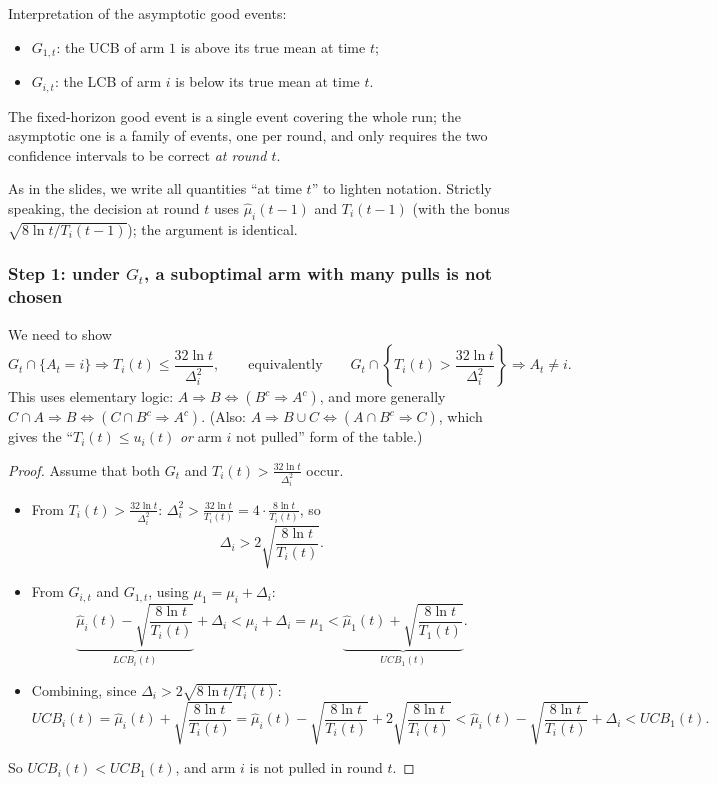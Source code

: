 Interpretation of the asymptotic good events:
\begin{itemize}
    \item $G_{1,t}$: the UCB of arm $1$ is above its true mean at time $t$;
    \item $G_{i,t}$: the LCB of arm $i$ is below its true mean at time $t$.
\end{itemize}
The fixed-horizon good event is a single event covering the whole run; the asymptotic one is a family of events, one per round, and only requires the two confidence intervals to be correct \emph{at round $t$}.

\begin{remark}[Indices]
As in the slides, we write all quantities ``at time $t$'' to lighten notation. Strictly speaking, the decision at round $t$ uses $\hat{\mu}_i(t-1)$ and $T_i(t-1)$ (with the bonus $\sqrt{8\ln t/T_i(t-1)}$); the argument is identical.
\end{remark}

\subsubsection*{Step 1: under $G_t$, a suboptimal arm with many pulls is not chosen}

We need to show
\[
G_t \cap \{A_t = i\} \Rightarrow T_i(t) \leq \frac{32\ln t}{\Delta_i^2},
\qquad\text{equivalently}\qquad
G_t \cap \left\{T_i(t) > \frac{32\ln t}{\Delta_i^2}\right\} \Rightarrow A_t \neq i.
\]
This uses elementary logic: $A \Rightarrow B \iff (B^c \Rightarrow A^c)$, and more generally $C \cap A \Rightarrow B \iff (C \cap B^c \Rightarrow A^c)$. (Also: $A \Rightarrow B \cup C \iff (A \cap B^c \Rightarrow C)$, which gives the ``$T_i(t) \leq u_i(t)$ \emph{or} arm $i$ not pulled'' form of the table.)

\begin{proof}
Assume that both $G_t$ and $T_i(t) > \frac{32\ln t}{\Delta_i^2}$ occur.
\begin{itemize}
    \item From $T_i(t) > \frac{32\ln t}{\Delta_i^2}$: $\Delta_i^2 > \frac{32\ln t}{T_i(t)} = 4\cdot\frac{8\ln t}{T_i(t)}$, so
    \[
    \Delta_i > 2\sqrt{\frac{8\ln t}{T_i(t)}}.
    \]
    \item From $G_{i,t}$ and $G_{1,t}$, using $\mu_1 = \mu_i + \Delta_i$:
    \[
    \underbrace{\hat{\mu}_i(t) - \sqrt{\frac{8\ln t}{T_i(t)}}}_{LCB_i(t)} + \Delta_i < \mu_i + \Delta_i = \mu_1 < \underbrace{\hat{\mu}_1(t) + \sqrt{\frac{8\ln t}{T_1(t)}}}_{UCB_1(t)}.
    \]
    \item Combining, since $\Delta_i > 2\sqrt{8\ln t/T_i(t)}$:
    \[
    UCB_i(t) = \hat{\mu}_i(t) + \sqrt{\frac{8\ln t}{T_i(t)}} = \hat{\mu}_i(t) - \sqrt{\frac{8\ln t}{T_i(t)}} + 2\sqrt{\frac{8\ln t}{T_i(t)}} < \hat{\mu}_i(t) - \sqrt{\frac{8\ln t}{T_i(t)}} + \Delta_i < UCB_1(t).
    \]
\end{itemize}
So $UCB_i(t) < UCB_1(t)$, and arm $i$ is not pulled in round $t$.
\end{proof}


